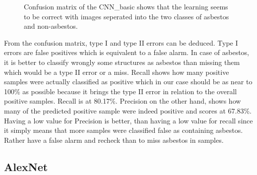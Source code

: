\begin{figure}[!h]
\centering
\caption{Confusion matrix of the CNN\_basic shows that the learning seems to be correct with images seperated into the two classes of asbestos and non-asbestos.}
\label{fig:cnn-basic-cm}
\end{figure}

From the confusion matrix, type I and type II errors can be deduced. Type I errors are false positives which is equivalent to a false alarm. In case of asbestos, it is better to classify wrongly some structures as asbestos than missing them which would be a type II error or a miss. Recall shows how many positive samples were actually classified as positive which in our case should be as near to 100\% as possible because it brings the type II error in relation to the overall positive samples. Recall is at 80.17\%. Precision on the other hand, shows how many of the predicted positive sample were indeed positive and scores at 67.83\%. Having a low value for Precision is better, than having a low value for recall since it simply means that more samples were classified false as containing asbestos. Rather have a false alarm and recheck than to miss asbestos in samples. \\















\subsection{AlexNet}

